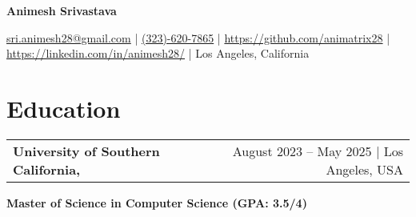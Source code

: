 \documentclass[10pt, legalpaper]{article}
\newenvironment{onecolentry}{
    \par\noindent
}{
    \par
}
\newenvironment{header}{
    \setlength{\topsep}{0pt}\par\kern\topsep\centering\linespread{1.5}
}{
    \par\kern\topsep
}
\begin{document}
\begin{header}
    \fontsize{21 pt}{21 pt}\selectfont \textbf{Animesh Srivastava}
\end{header}
\vspace{3 pt}
    
\begin{onecolentry}

    \centering
    \small
    \href{mailto:sri.animesh28@gmail.com}{sri.animesh28@gmail.com} | 
    \href{tel:+1-323-620-7865}{(323)-620-7865} | 
    \href{https://github.com/animatrix28}{https://github.com/animatrix28} | 
    \href{https://www.linkedin.com/in/animesh28/}{https://linkedin.com/in/animesh28/} | 
    Los Angeles, California
\end{onecolentry}


\vspace{-2 pt}




\section{Education}

\begin{tabularx}{\textwidth}{@{}Xr@{}}
    \textbf{University of Southern California,} & August 2023 – May 2025 | Los Angeles, USA \\
\end{tabularx}
\vspace{-4.5mm}
\begin{onecolentry}

    \textbf{Master of Science in Computer Science (GPA: 3.5/4)}
\end{onecolentry}
\end{document}
